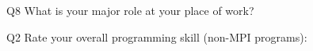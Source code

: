 \begin{description}%
\item{Q8} What is your major role at your place of work?%
\item{Q2} Rate your overall programming skill (non-MPI programs):%
\end{description}%
